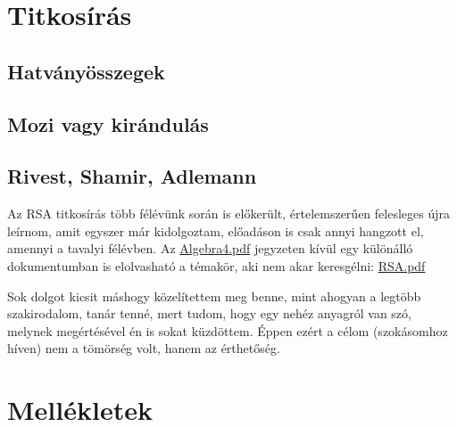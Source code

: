 \documentclass[12pt]{book}
\theoremstyle{plain} %
\theoremstyle{definition} %
\theoremstyle{remark}
\numberwithin{equation}{section}  %
\begin{document}
	\chapter{Titkosírás}
	\section{Hatványösszegek} %
	\section{Mozi vagy kirándulás} %
	\section{Rivest, Shamir, Adlemann}
	
	Az RSA titkosírás több félévünk során is előkerült, értelemszerűen felesleges újra leírnom, amit egyszer már kidolgoztam, előadáson is csak annyi hangzott el, amennyi a tavalyi félévben. Az  \href{http://vasgyura96.web.elte.hu/files/algebra4.pdf}{Algebra4.pdf} jegyzeten kívül egy különálló dokumentumban is elolvasható a témakör, aki nem akar keresgélni: \href{http://vasgyura96.web.elte.hu/files/RSA.pdf}{RSA.pdf}
	
	Sok dolgot kicsit máshogy közelítettem meg benne, mint ahogyan a legtöbb szakirodalom, tanár tenné, mert tudom, hogy egy nehéz anyagról van szó, melynek megértésével én is sokat küzdöttem. Éppen ezért a célom (szokásomhoz híven) nem a tömörség volt, hanem az érthetőség.
	
	\chapter*{Mellékletek}
	
	\setcounter{chapter}{\thechapter+1}
	\setcounter{section}{0}
	
\end{document}
